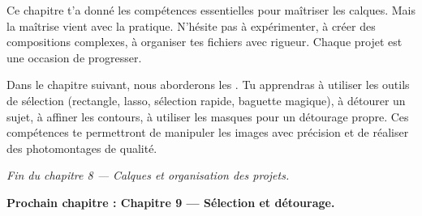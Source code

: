 Ce chapitre t'a donné les compétences essentielles pour maîtriser les calques. Mais la maîtrise vient avec la pratique. N'hésite pas à expérimenter, à créer des compositions complexes, à organiser tes fichiers avec rigueur. Chaque projet est une occasion de progresser.

Dans le chapitre suivant, nous aborderons les . Tu apprendras à utiliser les outils de sélection (rectangle, lasso, sélection rapide, baguette magique), à détourer un sujet, à affiner les contours, à utiliser les masques pour un détourage propre. Ces compétences te permettront de manipuler les images avec précision et de réaliser des photomontages de qualité.

\vspace{2em}

\begin{center}
\textit{Fin du chapitre 8 --- Calques et organisation des projets.}

\vspace{1em}

\textbf{Prochain chapitre : Chapitre 9 --- Sélection et détourage.}
\end{center}